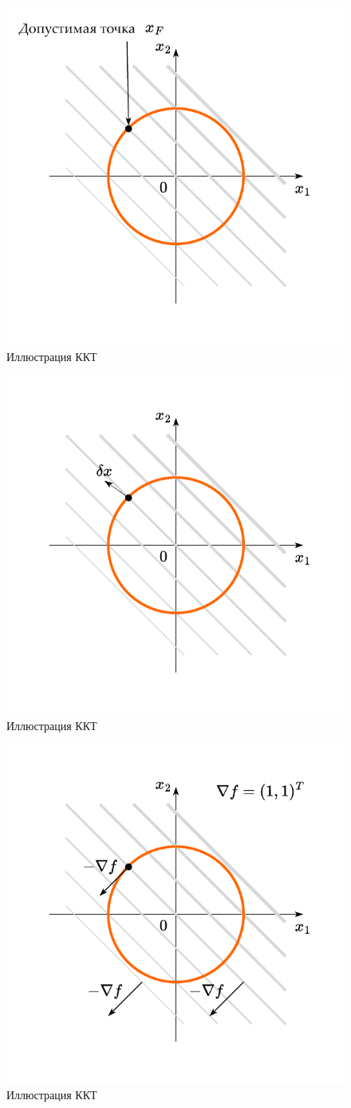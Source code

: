 \documentclass[
  russian,
  letterpaper,
  DIV=11,
  numbers=noendperiod]{scrartcl}
\begin{document}
\begin{figure}[H]

{\centering \includegraphics[width=0.5\linewidth,height=\textheight,keepaspectratio]{eq_constraint_3_ru.pdf}

}

\caption{Иллюстрация ККТ}

\end{figure}%

\begin{figure}[H]

{\centering \includegraphics[width=0.5\linewidth,height=\textheight,keepaspectratio]{eq_constraint_4.pdf}

}

\caption{Иллюстрация ККТ}

\end{figure}%

\begin{figure}[H]

{\centering \includegraphics[width=0.5\linewidth,height=\textheight,keepaspectratio]{eq_constraint_5.pdf}

}

\caption{Иллюстрация ККТ}

\end{figure}%
\end{document}
